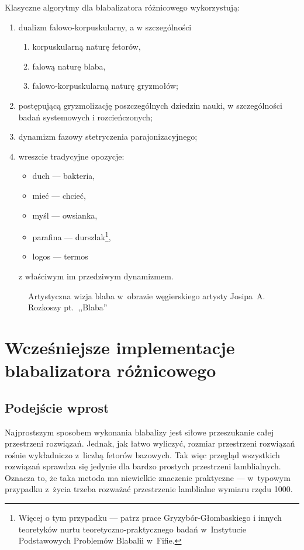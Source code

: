 \documentclass[licencjacka]{pracamgr}
\begin{document}
Klasyczne algorytmy dla blabalizatora różnicowego wykorzystują:
\begin{enumerate}
\item dualizm falowo-korpuskularny, a w szczególności
  \begin{enumerate}
  \item korpuskularną naturę fetorów,
  \item falową naturę blaba,
  \item falowo-korpuskularną naturę gryzmołów;
  \end{enumerate}
\item postępującą gryzmolizację poszczególnych dziedzin nauki, w
  szczególności badań systemowych i rozcieńczonych;
\item dynamizm fazowy stetryczenia parajonizacyjnego;
\item wreszcie tradycyjne opozycje:
  \begin{itemize}
  \item duch --- bakteria,
  \item mieć --- chcieć,
  \item myśl --- owsianka,
  \item parafina --- durszlak\footnote{Więcej o tym przypadku --- patrz
      prace Gryzybór-Głombaskiego i innych teoretyków nurtu
      teoretyczno-praktycznego badań w~Instytucie Podstawowych
      Problemów Blabalii w~Fifie.},
  \item logos --- termos%
  \end{itemize}
  z właściwym im przedziwym dynamizmem.
\end{enumerate}

\begin{figure}[tp]
  \centering
  \caption{Artystyczna wizja blaba w~obrazie węgierskiego artysty
    Josipa~A. Rozkoszy pt.~,,Blaba''}
\end{figure}

\chapter{Wcześniejsze implementacje blabalizatora
  różnicowego}\label{r:losers}

\section{Podejście wprost}

Najprostszym sposobem wykonania blabalizy jest siłowe przeszukanie
całej przestrzeni rozwiązań.  Jednak, jak łatwo wyliczyć, rozmiar
przestrzeni rozwiązań rośnie wykładniczo z~liczbą fetorów bazowych.
Tak więc przegląd wszystkich rozwiązań sprawdza się jedynie dla bardzo
prostych przestrzeni lamblialnych.  Oznacza to, że taka metoda ma
niewielkie znaczenie praktyczne --- w~typowym przypadku z~życia trzeba
rozważać przestrzenie lamblialne wymiaru rzędu 1000.
\end{document}
